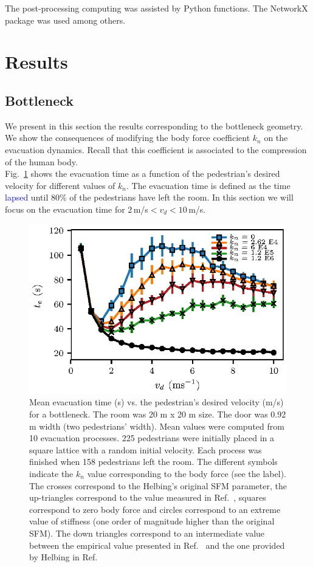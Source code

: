 \documentclass[preprint,12pt]{elsarticle}
\begin{document}
The post-processing computing was assisted by Python functions. The NetworkX 
package was used among others.   \\



\section{\label{results}Results}


\subsection{\label{bottleneck} Bottleneck}


We present in this section the results corresponding to the bottleneck geometry. 
We show the consequences of modifying the body force coefficient $k_n$ on the 
evacuation dynamics. Recall that this coefficient is associated 
to the compression of the human body. \\

Fig.~\ref{vd_vs_te} shows the evacuation time as a function of the pedestrian's 
desired velocity for different values of $k_n$. The evacuation 
time is defined as the time \textcolor{blue}{lapsed} until 80\% of the pedestrians have 
left the room. In this section we will focus on the evacuation time for 
$2\,$m/s$<v_d<10\,$m/s.\\


\begin{figure}[htbp!]
\centering
\includegraphics[width=0.7\columnwidth]
{./vd_vs_te_N225.eps}
\caption{\label{vd_vs_te}Mean evacuation time (s) vs. the pedestrian’s desired  
velocity (m/s) for a bottleneck. The room was 20 m x 20 m size. The door was 
0.92 m width (two pedestrians' width). Mean values were computed from 10 evacuation processes. 225 
pedestrians were initially placed in a square lattice with a random initial 
velocity. Each process was finished when 158 pedestrians left the room. The 
different symbols indicate the $k_n$ value corresponding to the body force (see 
the label). The crosses correspond to the Helbing's original SFM parameter, the 
up-triangles correspond to the value measured in 
Ref.~\cite{melvin1988aatd}, squares correspond 
to zero body force and circles correspond to an extreme value of stiffness (one 
order of magnitude higher than the original SFM). The 
 down triangles correspond to an intermediate value between the empirical value 
presented in Ref.~\cite{melvin1988aatd} and the one provided by Helbing in 
Ref.~\cite{helbing_2000} }
\end{figure}
\end{document}
